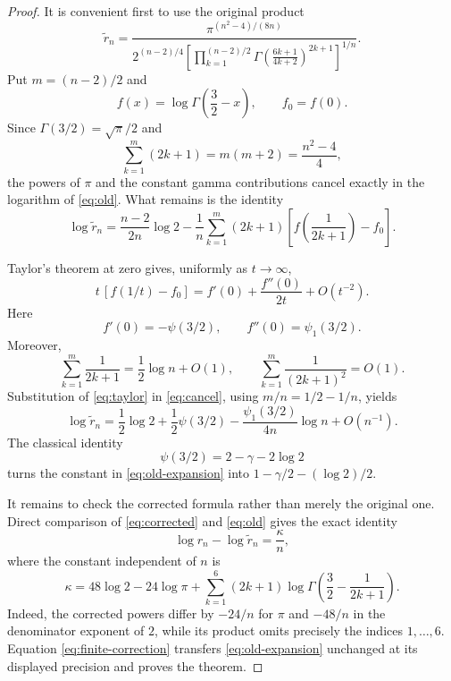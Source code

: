 \documentclass[11pt]{article}
\begin{document}
\begin{proof}
It is convenient first to use the original product
\begin{equation}\label{eq:old}
 \widetilde r_n=
 \frac{\pi^{(n^2-4)/(8n)}}{
 2^{(n-2)/4}
 \left[\displaystyle\prod_{k=1}^{(n-2)/2}
 \Gamma\!\left(\frac{6k+1}{4k+2}\right)^{2k+1}
 \right]^{1/n}}.
\end{equation}
Put $m=(n-2)/2$ and
\[
 f(x)=\log\Gamma\!\left(\frac32-x\right),\qquad f_0=f(0).
\]
Since $\Gamma(3/2)=\sqrt\pi/2$ and
\[
 \sum_{k=1}^{m}(2k+1)=m(m+2)=\frac{n^2-4}{4},
\]
the powers of $\pi$ and the constant gamma contributions cancel exactly in
the logarithm of \eqref{eq:old}.  What remains is the identity
\begin{equation}\label{eq:cancel}
 \log\widetilde r_n
 =\frac{n-2}{2n}\log2
  -\frac1n\sum_{k=1}^{m}(2k+1)
  \left[f\!\left(\frac1{2k+1}\right)-f_0\right].
\end{equation}

Taylor's theorem at zero gives, uniformly as $t\to\infty$,
\begin{equation}\label{eq:taylor}
 t\,[f(1/t)-f_0]
 =f'(0)+\frac{f''(0)}{2t}+O(t^{-2}).
\end{equation}
Here
\[
 f'(0)=-\psi(3/2),\qquad f''(0)=\psi_1(3/2).
\]
Moreover,
\[
 \sum_{k=1}^{m}\frac1{2k+1}=\frac12\log n+O(1),
 \qquad
 \sum_{k=1}^{m}\frac1{(2k+1)^2}=O(1).
\]
Substitution of \eqref{eq:taylor} in \eqref{eq:cancel}, using
$m/n=1/2-1/n$, yields
\begin{equation}\label{eq:old-expansion}
 \log\widetilde r_n
 =\frac12\log2+\frac12\psi(3/2)
  -\frac{\psi_1(3/2)}{4n}\log n+O(n^{-1}).
\end{equation}
The classical identity
\[
          \psi(3/2)=2-\gamma-2\log2
\]
turns the constant in \eqref{eq:old-expansion} into
$1-\gamma/2-(\log2)/2$.

It remains to check the corrected formula rather than merely the original
one.  Direct comparison of \eqref{eq:corrected} and \eqref{eq:old} gives the
exact identity
\begin{equation}\label{eq:finite-correction}
 \log r_n-\log\widetilde r_n=\frac{\kappa}{n},
\end{equation}
where the constant independent of $n$ is
\[
 \kappa=48\log2-24\log\pi
 +\sum_{k=1}^{6}(2k+1)
 \log\Gamma\!\left(\frac32-\frac1{2k+1}\right).
\]
Indeed, the corrected powers differ by $-24/n$ for $\pi$ and $-48/n$
in the denominator exponent of $2$, while its product omits precisely the
indices $1,\ldots,6$.  Equation \eqref{eq:finite-correction} transfers
\eqref{eq:old-expansion} unchanged at its displayed precision and proves the
theorem.
\end{proof}
\end{document}
